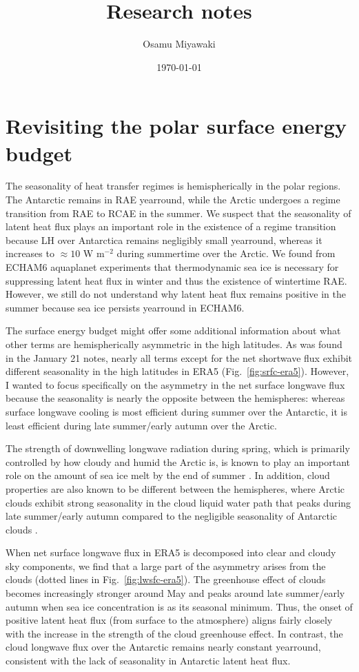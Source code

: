 \documentclass{article}
\title{Research notes}
\date{\today}
\author{Osamu Miyawaki}
\begin{document}
\maketitle

\section{Revisiting the polar surface energy budget}

The seasonality of heat transfer regimes is hemispherically in the polar regions. The Antarctic remains in RAE yearround, while the Arctic undergoes a regime transition from RAE to RCAE in the summer. We suspect that the seasonality of latent heat flux plays an important role in the existence of a regime transition because LH over Antarctica remains negligibly small yearround, whereas it increases to $\approx 10$ W m$^{-2}$ during summertime over the Arctic. We found from ECHAM6 aquaplanet experiments that thermodynamic sea ice is necessary for suppressing latent heat flux in winter and thus the existence of wintertime RAE. However, we still do not understand why latent heat flux remains positive in the summer because sea ice persists yearround in ECHAM6.

The surface energy budget might offer some additional information about what other terms are hemispherically asymmetric in the high latitudes. As was found in the January 21 notes, nearly all terms except for the net shortwave flux exhibit different seasonality in the high latitudes in ERA5 (Fig.~\ref{fig:srfc-era5}). However, I wanted to focus specifically on the asymmetry in the net surface longwave flux because the seasonality is nearly the opposite between the hemispheres: whereas surface longwave cooling is most efficient during summer over the Antarctic, it is least efficient during late summer/early autumn over the Arctic.

The strength of downwelling longwave radiation during spring, which is primarily controlled by how cloudy and humid the Arctic is, is known to play an important role on the amount of sea ice melt by the end of summer \citep{kapsch2016}. In addition, cloud properties are also known to be different between the hemispheres, where Arctic clouds exhibit strong seasonality in the cloud liquid water path that peaks during late summer/early autumn compared to the negligible seasonality of Antarctic clouds \citep[Fig.~2 in][]{lenaerts2017}.

When net surface longwave flux in ERA5 is decomposed into clear and cloudy sky components, we find that a large part of the asymmetry arises from the clouds (dotted lines in Fig.~\ref{fig:lwsfc-era5}). The greenhouse effect of clouds becomes increasingly stronger around May and peaks around late summer/early autumn when sea ice concentration is as its seasonal minimum. Thus, the onset of positive latent heat flux (from surface to the atmosphere) aligns fairly closely with the increase in the strength of the cloud greenhouse effect. In contrast, the cloud longwave flux over the Antarctic remains nearly constant yearround, consistent with the lack of seasonality in Antarctic latent heat flux.
\end{document}
